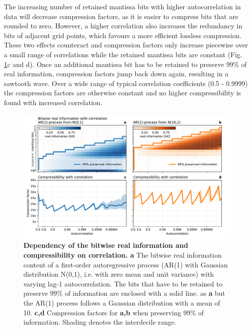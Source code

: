 The increasing number of retained mantissa bits with higher autocorrelation in data will decrease compression factors,
as it is easier to compress bits that are rounded to zero. However, a higher correlation also increases the redundancy
in bits of adjacent grid points, which favours a more efficient lossless compression. These two effects counteract and
compression factors only increase piecewise over a small range of correlations while the retained mantissa bits are
constant (Fig. \ref{fig:information_correlation}c and d). Once an additional mantissa bit has to be retained to preserve
99\% of real information, compression factors jump back down again, resulting in a sawtooth wave. Over a wide
range of typical correlation coefficients (0.5 - 0.9999) the compression factors are otherwise constant and no higher
compressibility is found with increased correlation. 

\begin{figure}[tbhp]
	\includegraphics[width=1\textwidth]{Figures/compression/correlation_ar1.pdf}
	\caption{\textbf{Dependency of the bitwise real information and compressibility on correlation. a}
	The bitwise real information content of a first-order autoregressive process (AR(1) with Gaussian distribution N(0,1),
	i.e. with zero mean and unit variance) with varying lag-1 autocorrelation. The bits that have to be retained to preserve
	99\% of information are enclosed with a solid line.  as \textbf{a} but the AR(1) process follows a Gaussian distribution with
	a mean of 10. \textbf{c,d} Compression factors for \textbf{a,b} when preserving 99\% of information. Shading denotes the interdecile range.}
	\label{fig:information_correlation}
\end{figure}

